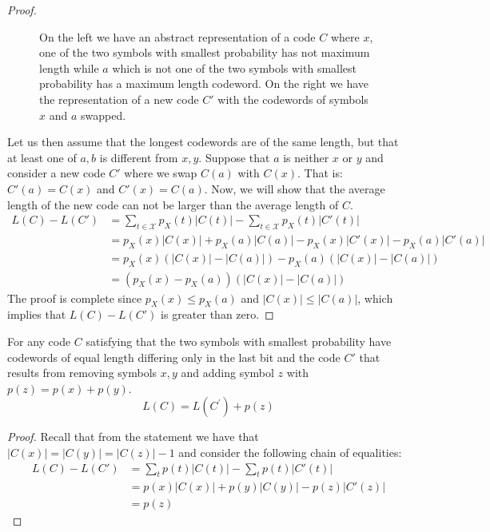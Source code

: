 \begin{proof}
\begin{figure}
\begin{subfigure}{.5\textwidth}
  
  \caption{} \label{fig:hfig1}
\end{subfigure}%
\begin{subfigure}{.5\textwidth}
  
  \caption{} \label{fig:hfig2}
\end{subfigure}
\caption{On the left we have an abstract representation of a code $C$ where $x$, one of the two symbols with smallest probability has not maximum length while $a$ which is not one of the two symbols with smallest probability has a maximum length codeword. On the right we have the representation of a new code $C'$ with the codewords of symbols $x$ and $a$ swapped.}\label{fig:huff2}
\end{figure}
Let us then assume that the longest codewords are of the same length, but that at least one of $a,b$ is different from $x,y$. Suppose that $a$ is neither $x$ or $y$ and consider a new code $C'$ where we swap $C(a)$ with $C(x)$. That is: $C'(a)=C(x)$ and $C'(x)=C(a)$. Now, we will show that the average length of the new code can not be larger than the average length of $C$.
\begin{align}
L(C)-L(C')&=\sum_{t\in\mathcal X}p_X(t)|C(t)|-\sum_{t\in\mathcal X}p_X(t)|C'(t)|\\
          &=p_X(x)|C(x)|+p_X(a)|C(a)|-p_X(x)|C'(x)|-p_X(a)|C'(a)|\\
          &=p_X(x)(|C(x)|-|C(a)|)-p_X(a)(|C(x)|-|C(a)|)\\
          &=(p_X(x)-p_X(a))(|C(x)|-|C(a)|)
\end{align}
The proof is complete since $p_X(x)\leq p_X(a)$ and $|C(x)|\leq |C(a)|$, which implies that $L(C)-L(C')$ is greater than zero.
\end{proof}
\begin{lemma}
For any code $C$ satisfying that the two symbols with smallest probability have codewords of equal length differing only in the last bit and the code $C\prime$ that results from removing symbols $x,y$ and adding symbol $z$ with $p\left(z\right)=p\left(x\right)+p(y)$.
\begin{equation}
L\left(C\right)=L\left(C^\prime\right)+p(z)  
\end{equation}
\end{lemma}
\begin{proof}
Recall that from the statement we have that $|C(x)|=|C(y)|=|C(z)|-1$ and consider the following chain of equalities:
\begin{align}
L(C)-L(C')&=\sum_{t}p(t)|C(t)|-\sum_{t}p(t)|C'(t)|\\
          &= p(x)|C(x)|+p(y)|C(y)|-p(z)|C'(z)|\\
          &= p(z)
\end{align}
\end{proof}
